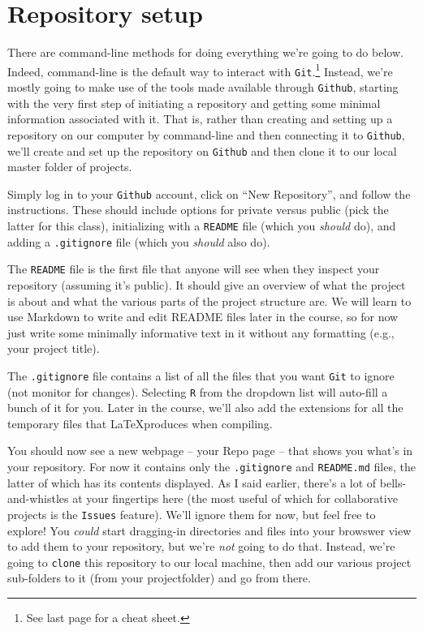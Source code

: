 \documentclass[12pt,letterpaper]{article}
\begin{document}
\section{Repository setup}
There are command-line methods for doing everything we're going to do below.
Indeed, command-line is the default way to interact with \texttt{Git}.\footnote{See last page for a cheat sheet.}
Instead, we're mostly going to make use of the tools made available through \texttt{Github}, starting with the very first step of initiating a repository and getting some minimal information associated with it.
That is, rather than creating and setting up a repository on our computer by command-line and then connecting it to \texttt{Github}, we'll create and set up the repository on \texttt{Github} and then clone it to our local master folder of projects.

Simply log in to your \texttt{Github} account, click on ``New Repository'', and follow the instructions.
These should include options for private versus public (pick the latter for this class), initializing with a \texttt{README} file (which you \emph{should} do), and adding a \texttt{.gitignore} file (which you \emph{should} also do).

The \texttt{README} file is the first file that anyone will see when they inspect your repository (assuming it's public).
It should give an overview of what the project is about and what the various parts of the project structure are.
We will learn to use Markdown to write and edit README files later in the course, so for now just write some minimally informative text in it without any formatting (e.g., your project title).

The \texttt{.gitignore} file contains a list of all the files that you want \texttt{Git} to ignore (not monitor for changes).
Selecting \texttt{R} from the dropdown list will auto-fill a bunch of it for you.
Later in the course, we'll also add the extensions for all the temporary files that \LaTeX produces when compiling.

You should now see a new webpage -- your Repo page -- that shows you what's in your repository.
For now it contains only the \texttt{.gitignore} and \texttt{README.md} files, the latter of which has its contents displayed.
As I said earlier, there's a lot of bells-and-whistles at your fingertips here (the most useful of which for collaborative projects is the \texttt{Issues} feature).
We'll ignore them for now, but feel free to explore!
You \emph{could} start dragging-in directories and files into your browswer view to add them to your repository, but we're \emph{not} going to do that.
Instead, we're going to \texttt{clone} this repository to our local machine, then add our various project sub-folders to it (from your projectfolder) and go from there.
\end{document}
